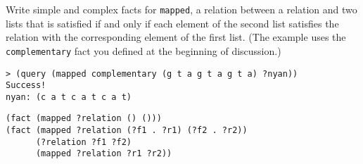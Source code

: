 \question Write simple and complex facts for {\tt mapped}, a relation between a
relation and two lists that is satisfied if and only if each element of the
second list satisfies the relation with the corresponding element of the first
list. (The example uses the {\tt complementary} fact you defined at the
beginning of discussion.)

\begin{lstlisting}
> (query (mapped complementary (g t a g t a g t a) ?nyan))
Success!
nyan: (c a t c a t c a t)
\end{lstlisting}

\begin{solution}[2in]
\begin{lstlisting}
(fact (mapped ?relation () ()))
(fact (mapped ?relation (?f1 . ?r1) (?f2 . ?r2))
      (?relation ?f1 ?f2)
      (mapped ?relation ?r1 ?r2))
\end{lstlisting}
\end{solution}

